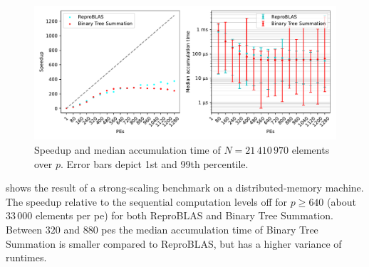 \begin{figure}
\centering
\includegraphics[scale=0.72]{figures/scaling.pdf}
\caption[Speedup and median accumulation time of $N=21\,410\,970$ elements over $p$.]{Speedup and median accumulation time of $N=21\,410\,970$ elements over $p$. Error bars depict 1st and 99th percentile.}
\label{fig:ClusterScaling}
\end{figure}


 shows the result of a strong-scaling benchmark on a distributed-memory machine.
The speedup relative to the sequential computation levels off for $p \geq 640$ (about $33\,000$ elements per \gls{pe}) for both ReproBLAS and Binary Tree Summation.
Between $320$ and $880$ \glspl{pe} the median accumulation time of Binary Tree Summation is smaller compared to ReproBLAS, but has a higher variance of runtimes.
